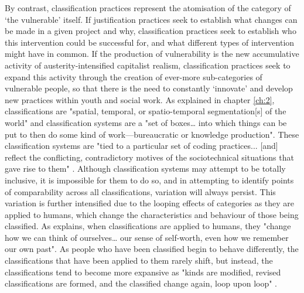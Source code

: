 By contrast, classification practices represent the atomisation of the category of `the vulnerable' itself. If justification practices seek to establish what changes can be made in a given project and why, classification practices seek to establish who this intervention could be successful for, and what different types of intervention might have in common. If the production of vulnerability is the new accumulative activity of austerity-intensified capitalist realism, classification practices seek to expand this activity through the creation of ever-more sub-categories of vulnerable people, so that there is the need to constantly `innovate' and develop new practices within youth and social work. As explained in chapter \ref{ch:2}, classifications are "spatial, temporal, or spatio-temporal segmentation[s] of the world" \citep[p. 110]{bowker_sorting_1999} and classification systems are a "set of boxes\ldots{} into which things can be put to then do some kind of work—bureaucratic or knowledge production". These classification systems are "tied to a particular set of coding practices... [and] reflect the conflicting, contradictory motives of the sociotechnical situations that gave rise to them" \cite[p. 64]{bowker_sorting_1999}.  Although classification systems may attempt to be totally inclusive, it is impossible for them to do so, and in attempting to identify points of comparability across all classifications, variation will always persist.  This variation is further intensified due to the looping effects of categories as they are applied to humans, which change the characteristics and behaviour of those being classified. As \citet[p. 369]{hacking_looping_1996} explains, when classifications are applied to humans, they "change how we can think of ourselves\ldots{} our sense of self-worth, even how we remember our own past". As people who have been classified begin to behave differently, the classifications that have been applied to them rarely shift, but instead, the classifications tend to become more expansive as "kinds are modified, revised classifications are formed, and the classified change again, loop upon loop" \citep[p. 370]{hacking_looping_1996}.

